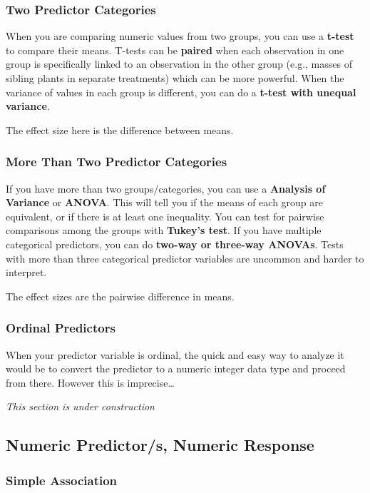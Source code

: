 \documentclass[
  letterpaper,
  DIV=11,
  numbers=noendperiod]{scrreprt}
\begin{document}
\subsubsection{Two Predictor Categories}\label{sec-ttest}

When you are comparing numeric values from two groups, you can use a
\textbf{t-test} to compare their means. T-tests can be \textbf{paired}
when each observation in one group is specifically linked to an
observation in the other group (e.g., masses of sibling plants in
separate treatments) which can be more powerful. When the variance of
values in each group is different, you can do a \textbf{t-test with
unequal variance}.

The effect size here is the difference between means.

\subsubsection{More Than Two Predictor Categories}\label{sec-anova}

If you have more than two groups/categories, you can use a
\textbf{Analysis of Variance} or \textbf{ANOVA}. This will tell you if
the means of each group are equivalent, or if there is at least one
inequality. You can test for pairwise comparisons among the groups with
\textbf{Tukey's test}. If you have multiple categorical predictors, you
can do \textbf{two-way or three-way ANOVAs}. Tests with more than three
categorical predictor variables are uncommon and harder to interpret.

The effect sizes are the pairwise difference in means.

\subsubsection{Ordinal Predictors}\label{ordinal-predictors}

When your predictor variable is ordinal, the quick and easy way to
analyze it would be to convert the predictor to a numeric integer data
type and proceed from there. However this is imprecise\ldots{}

\emph{This section is under construction}

\subsection{Numeric Predictor/s, Numeric
Response}\label{numeric-predictors-numeric-response}

\subsubsection{Simple Association}\label{sec-corr}
\end{document}
